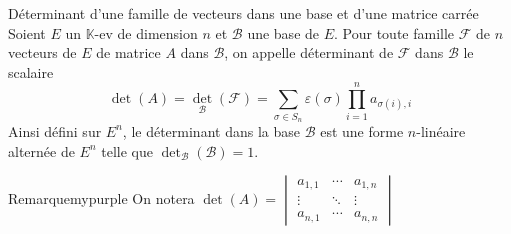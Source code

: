     \begin{defitheo}{Déterminant d’une famille de vecteurs dans une base et d’une matrice carrée}{}
        Soient $E$ un $\mathbb{K}$-ev de dimension $n$ et $\mathcal{B}$ une base de $E$. Pour toute famille $\mathcal{F}$ de $n$ vecteurs de $E$ de matrice $A$ dans $\mathcal{B}$, on appelle déterminant de $\mathcal{F}$ dans $\mathcal{B}$ le scalaire 
        \[ \det(A) = \det_{\mathcal{B}}(\mathcal{F}) = \sum_{\sigma \in S_n} \varepsilon(\sigma) \prod_{i=1}^n a_{\sigma(i),i} \]
        Ainsi défini sur $E^n$, le déterminant dans la base $\mathcal{B}$ est une forme $n$-linéaire alternée de $E^n$ telle que $\det_{\mathcal{B}}(\mathcal{B}) = 1$.
    \end{defitheo}

    \begin{omed}{Remarque}{mypurple}
        On notera $\det(A) = \begin{vmatrix}
            a_{1,1} & \cdots & a_{1,n} \\
            \vdots & \ddots & \vdots \\
            a_{n,1} & \cdots & a_{n,n}
        \end{vmatrix}$
    \end{omed}

